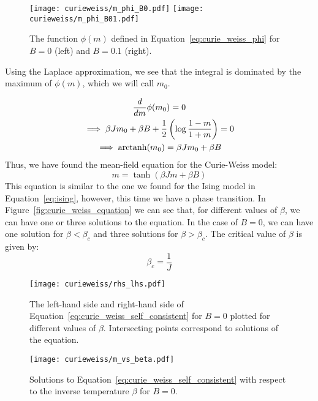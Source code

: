\begin{figure}[h]
    \centering
    \texttt{[image: curieweiss/m\_phi\_B0.pdf]}
    \texttt{[image: curieweiss/m\_phi\_B01.pdf]}
    \caption{The function $\phi(m)$ defined in Equation~\ref{eq:curie_weiss_phi} for $B=0$ (left) and $B=0.1$ (right).}
    \label{fig:curie_weiss_phi_B0}
\end{figure}

Using the Laplace approximation, we see that the integral is dominated by the maximum of $\phi(m)$, which we will call $m_0$.

\begin{equation}
    \begin{gathered}
        \frac{d}{dm}\phi(m_0) =  0 \\
        \implies \beta J m_0 + \beta B + \frac{1}{2}\left(\log \frac{1-m}{1+m}\right) = 0\\
        \implies \operatorname{arctanh}(m_0) = \beta J m_0 + \beta B\\
    \end{gathered}
\end{equation}
Thus, we have found the mean-field equation for the Curie-Weiss model:
\begin{equation}
    \label{eq:curie_weiss_self_consistent}
    m = \tanh(\beta J m + \beta B)
\end{equation}
This equation is similar to the one we found for the Ising model in Equation~\ref{eq:ising}, however, this time we have a phase transition. In Figure~\ref{fig:curie_weiss_equation} we can see that, for different values of $\beta$, we can have one or three solutions to the equation. In the case of $B=0$, we can have one solution for $\beta < \beta_c$ and three solutions for $\beta > \beta_c$. The critical value of $\beta$ is given by:
\begin{equation}
    \beta_c = \frac{1}{J}
\end{equation}

\begin{figure}[H]
    \centering
    \begin{minipage}[t]{0.45\textwidth}
        \centering
        \texttt{[image: curieweiss/rhs\_lhs.pdf]}
        \caption{The left-hand side and right-hand side of Equation~\ref{eq:curie_weiss_self_consistent} for $B=0$ plotted for different values of $\beta$. Intersecting points correspond to solutions of the equation.}
        \label{fig:curie_weiss_equation}
    \end{minipage}
    \hfill
    \begin{minipage}[t]{0.45\textwidth}
        \centering
        \texttt{[image: curieweiss/m\_vs\_beta.pdf]}
        \caption{Solutions to Equation~\ref{eq:curie_weiss_self_consistent} with respect to the inverse temperature $\beta$ for $B=0$.}
        \label{fig:curie_weiss_solutions}
    \end{minipage}
\end{figure}